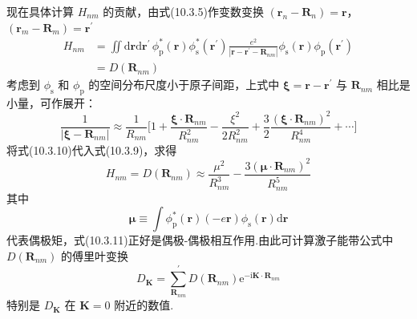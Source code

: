 现在具体计算 $H_{nm}$ 的贡献，由式(10.3.5)作变数变换 $(\boldsymbol{r}_{n}-\boldsymbol{R}_{n})=\boldsymbol{r}$，$(\boldsymbol{r}_{m}-\boldsymbol{R}_{m})=\boldsymbol{r}^{\prime}$
\begin{equation}
\begin{aligned}
  H_{nm}&=\iint\mathrm{d}\boldsymbol{r}\mathrm{d}\boldsymbol{r}^{\prime}\,
  \phi_{\mathrm{p}}^{*}(\boldsymbol{r})\phi_{\mathrm{s}}^{*}(\boldsymbol{r}^{\prime})
  \frac{e^{2}}{|\boldsymbol{r}-\boldsymbol{r}^{\prime}-\boldsymbol{R}_{nm}|}
  \phi_{\mathrm{s}}(\boldsymbol{r})\phi_{\mathrm{p}}(\boldsymbol{r}^{\prime})\\
  &=D(\boldsymbol{R}_{nm})
\end{aligned}
\end{equation}
考虑到 $\phi_{\mathrm{s}}$ 和 $\phi_{\mathrm{p}}$ 的空间分布尺度小于原子间距，上式中 $\boldsymbol{\xi}=\boldsymbol{r}-\boldsymbol{r}^{\prime}$ 与 $\boldsymbol{R}_{nm}$ 相比是小量，可作展开：
\begin{equation}
  \frac{1}{|\boldsymbol{\xi}-\boldsymbol{R}_{nm}|}\approx\frac{1}{R_{nm}}
  \biggl[1+\frac{\boldsymbol{\xi}\cdot\boldsymbol{R}_{nm}}{R_{nm}^{2}}
  -\frac{\xi^{2}}{2R_{nm}^{2}}
  +\frac{3}{2}\frac{(\boldsymbol{\xi}\cdot\boldsymbol{R}_{nm})^{2}}{R_{nm}^{4}}
  +\cdots\biggr]
\end{equation}
将式(10.3.10)代入式(10.3.9)，求得
\begin{equation}
  H_{nm}=D(\boldsymbol{R}_{nm})\approx\frac{\mu^{2}}{R_{nm}^{3}}
  -\frac{3(\boldsymbol{\mu}\cdot\boldsymbol{R}_{nm})^{2}}{R_{nm}^{5}}
\end{equation}
其中
\begin{equation}
  \boldsymbol{\mu}\equiv\int\phi_{\mathrm{p}}^{*}(\boldsymbol{r})
  \left(-e\boldsymbol{r}\right)\phi_{\mathrm{s}}(\boldsymbol{r})\mathrm{d}\boldsymbol{r}
\end{equation}
代表偶极矩，式(10.3.11)正好是偶极-偶极相互作用.由此可计算激子能带公式中 $D(\boldsymbol{R}_{nm})$ 的傅里叶变换
\begin{equation}
  D_{\boldsymbol{K}}=\sum_{\boldsymbol{R}_{nm}}^{\prime}D(\boldsymbol{R}_{nm})
  \mathrm{e}^{-\mathrm{i}\boldsymbol{K}\cdot\boldsymbol{R}_{nm}}
\end{equation}
特别是 $D_{\boldsymbol{K}}$ 在 $\boldsymbol{K}=0$ 附近的数值.

